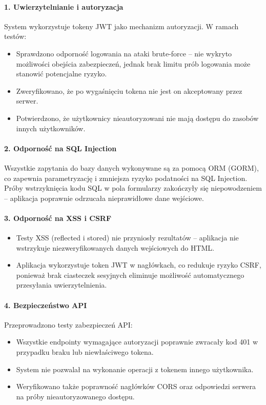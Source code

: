\paragraph{1. Uwierzytelnianie i autoryzacja}
System wykorzystuje tokeny JWT jako mechanizm autoryzacji. W ramach testów:
\begin{itemize}
    \item Sprawdzono odporność logowania na ataki brute-force – nie wykryto możliwości obejścia zabezpieczeń, jednak brak limitu prób logowania może stanowić potencjalne ryzyko.
    \item Zweryfikowano, że po wygaśnięciu tokena nie jest on akceptowany przez serwer.
    \item Potwierdzono, że użytkownicy nieautoryzowani nie mają dostępu do zasobów innych użytkowników.
\end{itemize}

\paragraph{2. Odporność na SQL Injection}
Wszystkie zapytania do bazy danych wykonywane są za pomocą ORM (GORM), co zapewnia parametryzację i zmniejsza ryzyko podatności na SQL Injection. Próby wstrzyknięcia kodu SQL w pola formularzy zakończyły się niepowodzeniem – aplikacja poprawnie odrzucała nieprawidłowe dane wejściowe.

\paragraph{3. Odporność na XSS i CSRF}
\begin{itemize}
    \item Testy XSS (reflected i stored) nie przyniosły rezultatów – aplikacja nie wstrzykuje niezweryfikowanych danych wejściowych do HTML.
    \item Aplikacja wykorzystuje token JWT w nagłówkach, co redukuje ryzyko CSRF, ponieważ brak ciasteczek sesyjnych eliminuje możliwość automatycznego przesyłania uwierzytelnienia.
\end{itemize}

\paragraph{4. Bezpieczeństwo API}
Przeprowadzono testy zabezpieczeń API:
\begin{itemize}
    \item Wszystkie endpointy wymagające autoryzacji poprawnie zwracały kod 401 w przypadku braku lub niewłaściwego tokena.
    \item System nie pozwalał na wykonanie operacji z tokenem innego użytkownika.
    \item Weryfikowano także poprawność nagłówków CORS oraz odpowiedzi serwera na próby nieautoryzowanego dostępu.
\end{itemize}

